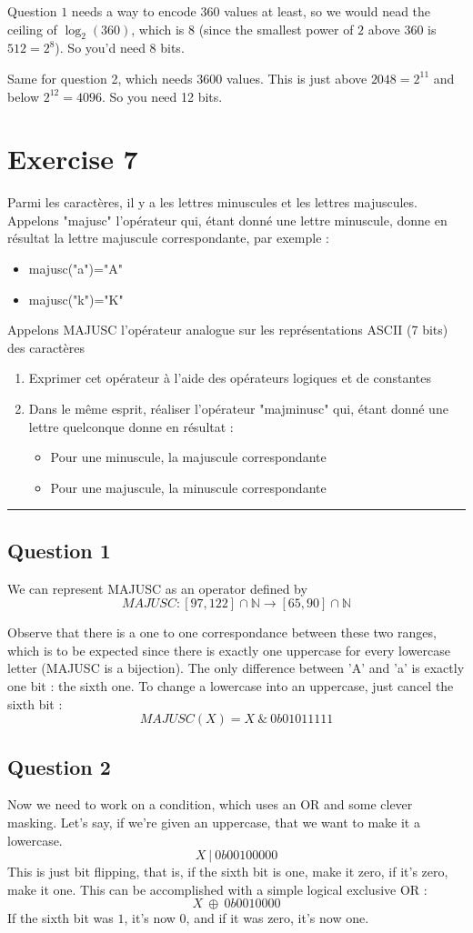 \documentclass[a4paper,10pt]{article}
\def\centralruler{\begin{center}\rule{5cm}{.1pt}\end{center}}
\newcommand{\N}{\mathbb{N}}
\begin{document}
Question $1$ needs a way to encode $360$ values at least, so we would nead the ceiling of $\log_2(360)$, which is 8 (since the smallest power of $2$ above $360$ is $512=2^8$). So you'd need $8$ bits.

Same for question 2, which needs $3600$ values. This is just above $2048=2^{11}$ and below $2^{12}=4096$. So you need 12 bits.

\section{Exercise 7}
Parmi les caractères, il y a les lettres minuscules et les lettres majuscules. Appelons "majusc" l'opérateur qui, étant donné une lettre minuscule, donne en résultat la lettre majuscule correspondante, par exemple :
\begin{itemize}
	\item majusc("a")="A"
	\item majusc("k")="K"
\end{itemize}
Appelons MAJUSC l'opérateur analogue sur les représentations ASCII (7 bits) des caractères
\begin{enumerate}
	\item Exprimer cet opérateur à l'aide des opérateurs logiques et de constantes
	\item Dans le même esprit, réaliser l'opérateur "majminusc" qui, étant donné une lettre quelconque donne en résultat :
		\begin{itemize}
			\item Pour une minuscule, la majuscule correspondante
			\item Pour une majuscule, la minuscule correspondante
		\end{itemize}
\end{enumerate}

\centralruler{}

\subsection{Question 1}
We can represent MAJUSC as an operator defined by
\[
	MAJUSC: [97,122]\cap\N\to[65,90]\cap\N
\]

Observe that there is a one to one correspondance between these two ranges, which is to be expected since there is exactly one uppercase for every lowercase letter (MAJUSC is a bijection). The only difference between 'A' and 'a' is exactly one bit : the sixth one. To change a lowercase into an uppercase, just cancel the sixth bit :
\[
	MAJUSC(X) = X\ \&\ 0b01011111
\]

\subsection{Question 2}
Now we need to work on a condition, which uses an OR and some clever masking.
Let's say, if we're given an uppercase, that we want to make it a lowercase.
\[
	X\ |\ 0b00100000
\]
This is just bit flipping, that is, if the sixth bit is one, make it zero, if it's zero, make it one. This can be accomplished with a simple logical exclusive OR :
\[
	X\ \oplus\ 0b0010000
\]
If the sixth bit was $1$, it's now $0$, and if it was zero, it's now one.
\end{document}
